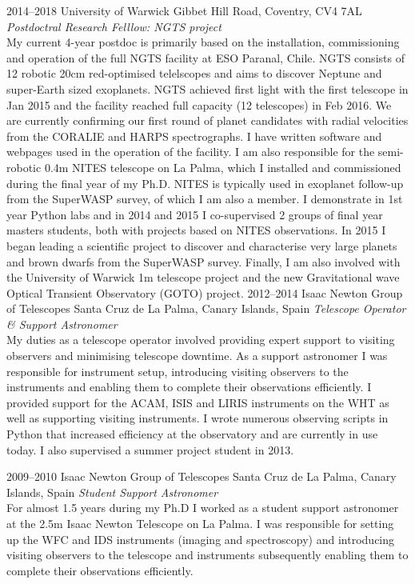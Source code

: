 \documentclass[print]{friggeri-cv} %
\begin{document}
\begin{entrylist}
\entry
{2014--2018}
{University of Warwick}
{Gibbet Hill Road, Coventry, CV4 7AL}
{\emph{Postdoctral Research Felllow: NGTS project}\\
My current 4-year postdoc is primarily based on the installation, commissioning and operation of the full NGTS facility at ESO Paranal, Chile. NGTS consists of 12 robotic 20cm red-optimised telelscopes and aims to discover Neptune and super-Earth sized exoplanets. NGTS achieved first light with the first telescope in Jan 2015 and the facility reached full capacity (12 telescopes) in Feb 2016. We are currently confirming our first round of planet candidates with radial velocities from the CORALIE and HARPS spectrographs. I have written software and webpages used in the operation of the facility. I am also responsible for the semi-robotic 0.4m NITES telescope on La Palma, which I installed and commissioned during the final year of my Ph.D. NITES is typically used in exoplanet follow-up from the SuperWASP survey, of which I am also a member. I demonstrate in 1st year Python labs and in 2014 and 2015 I co-supervised 2 groups of final year masters students, both with projects based on NITES observations. In 2015 I began leading a scientific project to discover and characterise very large planets and brown dwarfs from the SuperWASP survey. Finally, I am also involved with the University of Warwick 1m telescope project and the new Gravitational wave Optical Transient Observatory (GOTO) project. } 
\entry
{2012--2014}
{Isaac Newton Group of Telescopes}
{Santa Cruz de La Palma, Canary Islands, Spain}
{\emph{Telescope Operator \& Support Astronomer}\\
My duties as a telescope operator involved providing expert support to visiting observers and minimising telescope downtime. As a support astronomer I was responsible for instrument setup, introducing visiting observers to the instruments and enabling them to complete their observations efficiently. I provided support for the ACAM, ISIS and LIRIS instruments on the WHT as well as supporting visiting instruments. I wrote numerous observing scripts in Python that increased efficiency at the observatory and are currently in use today. I also supervised a summer project student in 2013.
} 
\end{entrylist}
\begin{entrylist}
\entry
{2009--2010}
{Isaac Newton Group of Telescopes}
{Santa Cruz de La Palma, Canary Islands, Spain}
{\emph{Student Support Astronomer} \\
For almost 1.5 years during my Ph.D I worked as a student support astronomer at the 2.5m Isaac Newton Telescope on La Palma. I was responsible for setting up the WFC and IDS instruments (imaging and spectroscopy) and introducing visiting observers to the telescope and instruments subsequently enabling them to complete their observations efficiently.}
\end{entrylist}
\end{document}
